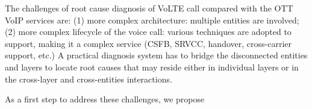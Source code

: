 The challenges of root cause diagnosis of VoLTE call compared with the OTT VoIP services are: (1) more complex architecture: multiple entities are involved; (2) more complex lifecycle of the voice call: various techniques are adopted to support, making it a complex service (CSFB, SRVCC, handover, cross-carrier support, etc.) A practical diagnosis system has to bridge the disconnected entities and layers to locate root causes that may reside either in individual layers or in the cross-layer and cross-entities interactions. 

As a first step to address these challenges, we propose 




